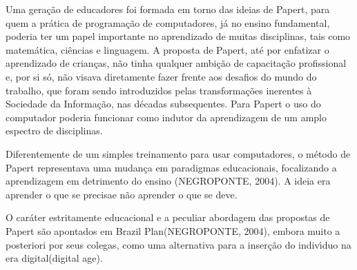 \documentclass[
12pt,		%
openright,	%
twoside,  %
a4paper,			%
chapter=TITLE,		%
english,			%
french,				%
spanish,			%
brazil				%
]{USPSC-classe/USPSC}
\begin{document}
Uma gera\c{c}\~ao de educadores foi formada em torno das ideias de Papert, para quem a pr\'atica de programa\c{c}\~ao de computadores, j\'a no ensino fundamental, poderia ter um papel importante no aprendizado de muitas disciplinas, tais como matem\'atica, ci\^encias e linguagem. A proposta de Papert, at\'e por enfatizar o aprendizado de crian\c{c}as, n\~ao tinha qualquer ambi\c{c}\~ao de capacita\c{c}\~ao profissional e, por si s\'o, n\~ao visava diretamente fazer frente aos desafios do \textquotedbl mundo do trabalho\textquotedbl , que foram sendo introduzidos pelas transforma\c{c}\~oes inerentes \`a Sociedade da Informa\c{c}\~ao, nas d\'ecadas subsequentes. Para Papert o uso do computador poderia funcionar como indutor da aprendizagem de um amplo espectro de disciplinas.

















Diferentemente de um simples treinamento para usar computadores, o m\'etodo de Papert representava uma mudan\c{c}a em paradigmas educacionais, focalizando a aprendizagem em detrimento do ensino  (NEGROPONTE, 2004). A ideia era \textquotedbl aprender o que se precisa\textquotedbl  e n\~ao \textquotedbl aprender o que se deve\textquotedbl .

















O car\'ater estritamente educacional e a peculiar abordagem das propostas de Papert s\~ao apontados em \textquotedbl Brazil Plan\textquotedbl   (NEGROPONTE, 2004), embora muito a posteriori por seus colegas, como uma alternativa para a inser\c{c}\~ao do indiv\'{\i}duo na \textquotedbl era digital\textquotedbl  (digital age).
\end{document}
